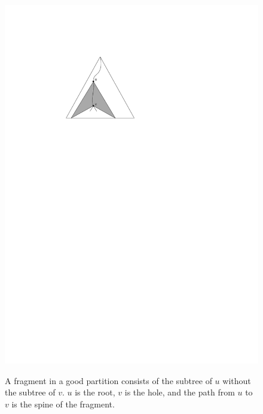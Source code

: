 \documentclass[a4paper,UKenglish]{lipics-v2016}
\theoremstyle{plain}
\begin{document}
\begin{figure}[ht]
{\caption{A fragment in a good partition consists of the subtree of $u$ without the subtree of $v$.
$u$ is the root, $v$ is the hole, and the path from $u$ to $v$ is the spine of the fragment.}}
{\includegraphics[scale=0.7]{fragment}}
\end{figure}
\end{document}
